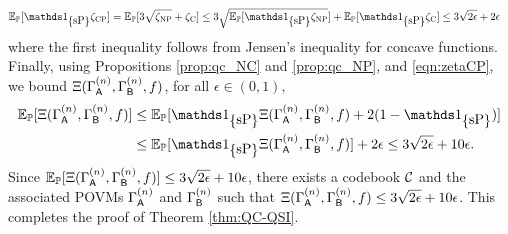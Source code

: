 \begin{align}
\EE_\PP[&\I_{\curly{\mbox{\normalfont sP}}}\zeta_{\text{CP}}] = \EE_\PP[3\sqrt{\zeta_{\text{NP}}}+\zeta_{\text{C}}] \leq 3\sqrt{\EE_\PP[\I_{\curly{\mbox{\normalfont sP}}} \zeta_{\text{NP}}}]+\EE_{\PP}[\I_{\curly{\mbox{\normalfont sP}}}\zeta_{\text{C}}] \leq 3\sqrt{2\epsilon}+2\epsilon\label{eqn:zetaCP}
\end{align}
where the first inequality follows from Jensen's inequality for concave functions. Finally, using Propositions \ref{prop:qc_NC} and  \ref{prop:qc_NP}, and \eqref{eqn:zetaCP}, we bound $\Xi(\Gamma^{(n)}_{\mathsf{A}},\Gamma^{(n)}_{\mathsf{B}},f)$, for all $\epsilon\in(0,1),$
\begin{align*}
    \EE_\PP[\error]&\leq \EE_\PP[\I_{\curly{\mbox{\normalfont sP}}} 
\error  + 2(1- \I_{\curly{\mbox{\normalfont sP}}})] \\&\leq \EE_\PP[\I_{\curly{\mbox{\normalfont sP}}} 
\error] +2\epsilon \leq 3\sqrt{2\epsilon}+10\epsilon.
\end{align*}
Since $\mathbb{E}_{\mathbb{P}}[\Xi(\Gamma^{(n)}_{\mathsf{A}},\Gamma^{(n)}_{\mathsf{B}},f)]\leq 3\sqrt{2\epsilon}+10\epsilon$, there exists a codebook $\mathcal{C}$ and the associated POVMs $\Gamma^{(n)}_{\mathsf{A}}$ and $\Gamma^{(n)}_{\mathsf{B}}$ such that $\Xi(\Gamma^{(n)}_{\mathsf{A}},\Gamma^{(n)}_{\mathsf{B}},f)\leq 3\sqrt{2\epsilon}+10\epsilon$. This completes the proof of Theorem \ref{thm:QC-QSI}.